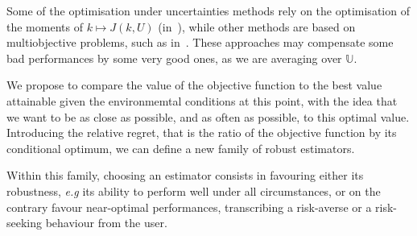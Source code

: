 \documentclass{MascotNumAbstract}
\begin{document}
  Some of the optimisation under uncertainties methods rely on the optimisation of the moments of $ k\mapsto J(k,U)$ (in~\cite{lehman_designing_2004,janusevskis_simultaneous_2010}), while other methods are based on multiobjective problems, such as in~\cite{baudoui_optimisation_2012,ribaud_krigeage_2018}.
  These approaches may compensate some bad performances by some very good ones, as we are averaging over $\mathbb{U}$. 

  
  We propose to compare the value of the objective function to the best value attainable given the environmemtal conditions at this point, with the idea that we want to be as close as possible, and as often as possible, to this optimal value. Introducing the relative regret, that is the ratio of the objective function by its conditional optimum, we can define a new family of robust estimators.

  Within this family, choosing an estimator consists in favouring either its robustness, \emph{e.g} its ability to perform well under all circumstances, or on the contrary favour near-optimal performances, transcribing a risk-averse or a risk-seeking behaviour from the user.
 

 




\end{document}
